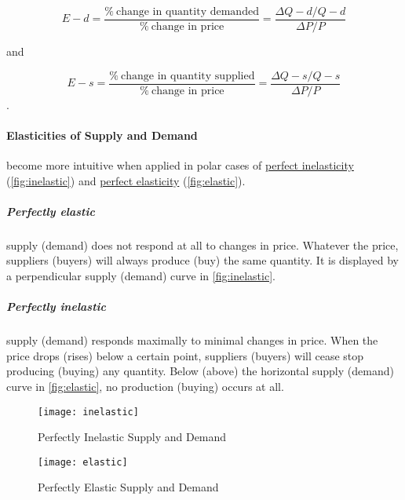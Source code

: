 	\begin{equation} \label{eq:PED}
			E-{d}=\frac{\%\ \mbox{change in quantity demanded}}{\%\ \mbox{change in price}}=\frac{\Delta Q-{d}/{Q-{d}}}{{\Delta P}/{P}}
	\end{equation}

 and

 	\begin{equation} \label{eq:PES}
			E-{s}=\frac{\%\ \mbox{change in quantity supplied}}{\%\ \mbox{change in price}}=\frac{\Delta Q-{s}/{Q-{s}}}{{\Delta P}/{P}}
	\end{equation}.

\paragraph{Elasticities of Supply and Demand}
become more intuitive when applied in polar cases of \href{fig:inelastic}{perfect inelasticity} (\autoref{fig:inelastic}) and \href{fig:elastic}{perfect elasticity} (\autoref{fig:elastic}).


\subparagraph{Perfectly elastic}
supply (demand) does not respond at all to changes in price.
Whatever the price, suppliers (buyers) will always produce (buy) the same quantity.
It is displayed by a perpendicular supply (demand) curve in \autoref{fig:inelastic}.

\subparagraph{Perfectly inelastic}
supply (demand) responds maximally to minimal changes in price.
When the price drops (rises) below a certain point, suppliers (buyers) will cease stop producing (buying) any quantity.
Below (above) the horizontal supply (demand) curve in \autoref{fig:elastic}, no production (buying) occurs at all.

 \begin{figure}[htbp]
	\centering
	\texttt{[image: inelastic]}
	\caption{Perfectly Inelastic Supply and Demand}
	\label{fig:inelastic}
\end{figure}

 \begin{figure}[htbp]
	\centering
	\texttt{[image: elastic]}
	\caption{Perfectly Elastic Supply and Demand}
	\label{fig:elastic}
\end{figure}

